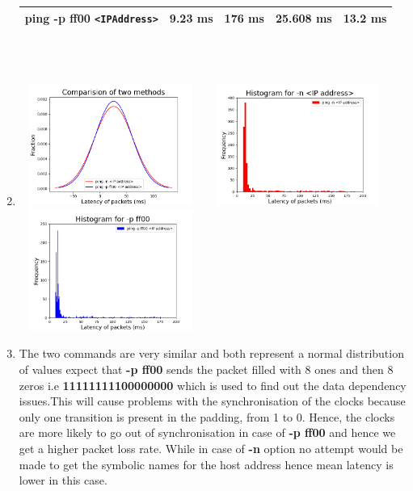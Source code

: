 \documentclass[a4paper,11pt]{article}
\begin{document}
\begin{enumerate}[itemsep=-3pt,label=(\alph*)]
\begin{tabular}{|c|c|c|c|c|}
		\rowcolor[RGB]{0, 247, 255}
		ping -p ff00 \verb|<IPAddress>| &9.23 ms & 176 ms & 25.608 ms &13.2 ms
		\\ \hline
	\end{tabular}\\ \\
    \item \includegraphics[width=60mm, height=40mm]{comp} \includegraphics[width=60mm, height=40mm]{1} \includegraphics[width=60mm, height=40mm]{2}\\
    \item The two commands are very similar and both represent a normal distribution of values expect that \textbf{-p ff00} sends the packet filled with 8 ones and then 8 zeros i.e \textbf{11111111100000000} which is used to find out the data dependency issues.This will
    cause problems with the synchronisation of the clocks because only one transition is present in the padding, from 1 to 0. Hence,
    the clocks are more likely to go out of synchronisation in case of \textbf{-p ff00} and hence we get a higher packet loss rate. While in case of \textbf{-n} option no attempt would be made to get the symbolic names for the host address hence mean latency is lower in this case.
\end{enumerate}
\end{document}

